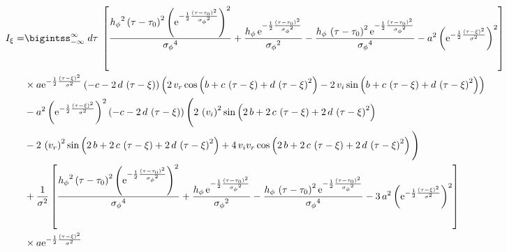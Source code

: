 \begin{align}
I_{\xi}  = & \bigintss_{-\infty}^{\infty}  \; d\tau\; \left[ \frac{{{ h_{\phi}}}^{2} \left( \tau-{ \tau_0} \right) ^{2} \left( {
{\rm e}^{-\frac{1}{2}{\frac { \left( \tau-{ \tau_0} \right) ^{2}}{{{ 
\sigma_{\phi}}}^{2}}}}} \right) ^{2}}{{{ \sigma_{\phi}}}^{4}}+\frac{{ h_{\phi}}
\,{{\rm e}^{-\frac{1}{2}{\frac { \left( \tau-{ \tau_0} \right) ^{2}}{{{ 
\sigma_{\phi}}}^{2}}}}}}{{{ \sigma_{\phi}}}^{2}}-\frac{{ h_{\phi}}\, \left( \tau-{
 \tau_0} \right) ^{2}{{\rm e}^{-\frac{1}{2}{\frac { \left( \tau-{ \tau_0}
 \right) ^{2}}{{{ \sigma_{\phi}}}^{2}}}}}}{{{ \sigma_{\phi}}}^{4}}-{a}^{
2} \left( {{\rm e}^{-\frac{1}{2}{\frac { \left( \tau-\xi \right) ^{2}}{{
\sigma}^{2}}}}} \right) ^{2} \right] \nonumber \\
& \times a{{\rm e}^{-\frac{1}{2}{\frac { \left( 
\tau-\xi \right) ^{2}}{{\sigma}^{2}}}}} \left( -c-2\,d\, \left( \tau-{
 \xi} \right)  \right)  \left( 2\,v_r \cos \left( b+c\, \left( \tau-\xi \right) +d\, \left( \tau-{
 \xi} \right) ^{2} \right) -2\,v_i 
\sin \left( b+c\, \left( \tau-\xi \right) +d\, \left( \tau-\xi
 \right) ^{2} \right)  \right) \nonumber \\
 &-{a}^{2} \left( {{\rm e}^{-\frac{1}{2}{\frac 
{ \left( \tau-\xi \right) ^{2}}{{\sigma}^{2}}}}} \right) ^{2}
 \left( -c-2\,d\, \left( \tau-\xi \right)  \right)  \Bigg( 2\,
 \left( v_i  \right) ^{2}\sin \left( 2
\,b+2\,c\, \left( \tau-\xi \right) +2\,d\, \left( \tau-\xi
 \right) ^{2} \right) \nonumber \\
 &-2\, \left( v_r
 \right) ^{2}\sin \left( 2\,b+2\,c\, \left( \tau-\xi \right) +2\,d\,
 \left( \tau-\xi \right) ^{2} \right) +4\, v_i v_r \cos \left( 2\,b+2\,c\,
 \left( \tau-\xi \right) +2\,d\, \left( \tau-\xi \right) ^{2}
 \right)  \Bigg) \nonumber \\
 &+ \frac{1}{{\sigma}^{2}}\left[\frac{ {{ h_{\phi}}}^{2} \left( \tau-{ \tau_0}
 \right) ^{2} \left( {{\rm e}^{-\frac{1}{2}{\frac { \left( \tau-{ \tau_0}
 \right) ^{2}}{{{ \sigma_{\phi}}}^{2}}}}} \right) ^{2}}{{{ \sigma_{\phi}
}}^{4}}+\frac{{ h_{\phi}}\,{{\rm e}^{-\frac{1}{2}{\frac { \left( \tau-{ \tau_0}
 \right) ^{2}}{{{ \sigma_{\phi}}}^{2}}}}}}{{{ \sigma_{\phi}}}^{2}}-\frac{{ 
h_{\phi}}\, \left( \tau-{ \tau_0} \right) ^{2}{{\rm e}^{-\frac{1}{2}{\frac {
 \left( \tau-{ \tau_0} \right) ^{2}}{{{ \sigma_{\phi}}}^{2}}}}}}{{{ 
\sigma_{\phi}}}^{4}}-3\,{a}^{2} \left( {{\rm e}^{-\frac{1}{2}{\frac { \left( \tau-
{ \xi} \right) ^{2}}{{\sigma}^{2}}}}} \right) ^{2} \right] \nonumber \\
&\times  a{{\rm e}
^{-\frac{1}{2}{\frac { \left( \tau-\xi \right) ^{2}}{{\sigma}^{2}}}}}

\end{align}
